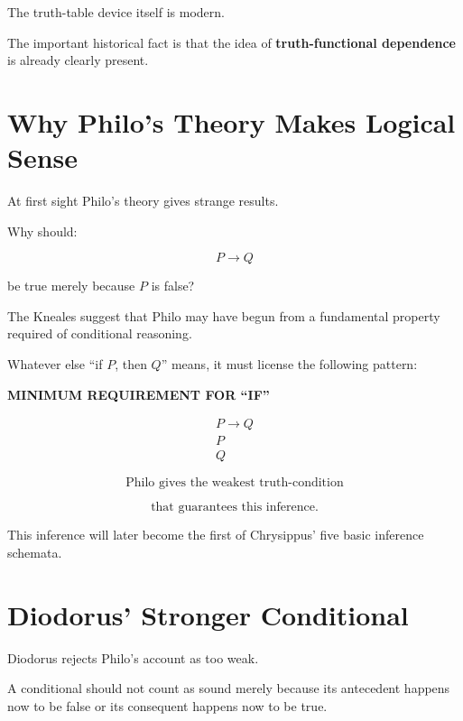 \documentclass[11pt]{article}
\begin{document}
The truth-table device itself is modern.

The important historical fact is that the idea of
\textbf{truth-functional dependence} is already clearly present.

\section{Why Philo's Theory Makes Logical Sense}

At first sight Philo's theory gives strange results.

Why should:

\[
P\rightarrow Q
\]

be true merely because \(P\) is false?

The Kneales suggest that Philo may have begun from a fundamental
property required of conditional reasoning.

Whatever else ``if \(P\), then \(Q\)'' means, it must license the
following pattern:

\begin{whiteboard}
\textbf{MINIMUM REQUIREMENT FOR ``IF''}

\[
\begin{array}{c}
P\rightarrow Q\\
P\\
\hline
Q
\end{array}
\]

\[
\boxed{
\text{Philo gives the weakest truth-condition}
}
\]

\[
\boxed{
\text{that guarantees this inference.}
}
\]
\end{whiteboard}

This inference will later become the first of Chrysippus' five
basic inference schemata.

\section{Diodorus' Stronger Conditional}

Diodorus rejects Philo's account as too weak.

A conditional should not count as sound merely because its
antecedent happens now to be false or its consequent happens now
to be true.
\end{document}
